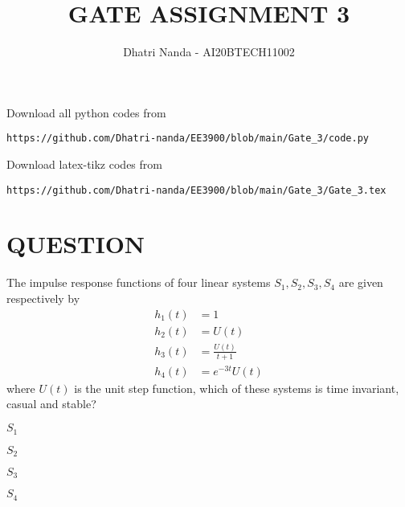 \documentclass[journal,12pt,twocolumn]{IEEEtran}
\begin{document}
\let\vec\mathbf
\renewcommand{\thefigure}{\theproblem}
\def\putbox#1#2#3{\makebox[0in][l]{\makebox[#1][l]{}\raisebox{\baselineskip}[0in][0in]{\raisebox{#2}[0in][0in]{#3}}}}
     \def\rightbox#1{\makebox[0in][r]{#1}}
     \def\centbox#1{\makebox[0in]{#1}}
     \def\topbox#1{\raisebox{-\baselineskip}[0in][0in]{#1}}
     \def\midbox#1{\raisebox{-0.5\baselineskip}[0in][0in]{#1}}
\vspace{3cm}
\title{\textbf{ GATE ASSIGNMENT 3}}
\author{Dhatri Nanda - AI20BTECH11002}
\maketitle
\newpage
\bigskip
\renewcommand{\thefigure}{\arabic{figure}}
\renewcommand{\thetable}{\arabic{table}}
Download all python codes from 
\begin{lstlisting}
https://github.com/Dhatri-nanda/EE3900/blob/main/Gate_3/code.py
\end{lstlisting}
%
Download latex-tikz codes from 
%
\begin{lstlisting}
https://github.com/Dhatri-nanda/EE3900/blob/main/Gate_3/Gate_3.tex
\end{lstlisting}
\section*{QUESTION}
The impulse response functions of four linear systems $S_1,S_2,S_3,S_4$ are given respectively by 
\begin{align}
    h_1(t) &= 1\\
    h_2(t) &= U(t)\\
    h_3(t) &= \frac{U(t)}{t+1}\\
    h_4(t) &= e^{-3t}U(t)
\end{align}
where $U(t)$ is the unit step function, which of these systems is time invariant, casual and stable?
\begin{enumerate}[label={\alph*)}]
\begin{multicols}{4}
\setlength\itemsep{2em}
\item $S_1$\\
\item $S_2$\\
\item $S_3$\\
\item $S_4$\\
\end{multicols}
\end{enumerate}
\end{document}

